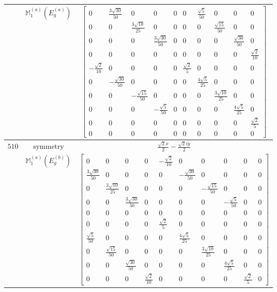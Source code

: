 \documentclass[fleqn,8pt,landscape]{jsarticle}
\begin{document}
\begin{longtable}{ccc}
$  $ & $ \mathbb{M}_{1}^{(a)}(E_{g}^{(a)}) $ & $ \begin{bmatrix} 0 & \frac{3 \sqrt{30}}{50} & 0 & 0 & 0 & 0 & \frac{\sqrt{5}}{50} & 0 & 0 & 0 \\ 0 & 0 & \frac{3 \sqrt{10}}{25} & 0 & 0 & 0 & 0 & \frac{\sqrt{15}}{50} & 0 & 0 \\ 0 & 0 & 0 & \frac{3 \sqrt{30}}{50} & 0 & 0 & 0 & 0 & \frac{\sqrt{30}}{50} & 0 \\ 0 & 0 & 0 & 0 & 0 & 0 & 0 & 0 & 0 & \frac{\sqrt{2}}{10} \\ - \frac{\sqrt{2}}{10} & 0 & 0 & 0 & 0 & \frac{\sqrt{2}}{5} & 0 & 0 & 0 & 0 \\ 0 & - \frac{\sqrt{30}}{50} & 0 & 0 & 0 & 0 & \frac{4 \sqrt{5}}{25} & 0 & 0 & 0 \\ 0 & 0 & - \frac{\sqrt{15}}{50} & 0 & 0 & 0 & 0 & \frac{3 \sqrt{10}}{25} & 0 & 0 \\ 0 & 0 & 0 & - \frac{\sqrt{5}}{50} & 0 & 0 & 0 & 0 & \frac{4 \sqrt{5}}{25} & 0 \\ 0 & 0 & 0 & 0 & 0 & 0 & 0 & 0 & 0 & \frac{\sqrt{2}}{5} \\ 0 & 0 & 0 & 0 & 0 & 0 & 0 & 0 & 0 & 0 \end{bmatrix} $ \\ \hline
$ 510 $ & $ \text{symmetry} $ & $ \frac{\sqrt{2} x}{2} - \frac{\sqrt{2} i y}{2} $ \\
$  $ & $ \mathbb{M}_{1}^{(a)}(E_{g}^{(b)}) $ & $ \begin{bmatrix} 0 & 0 & 0 & 0 & - \frac{\sqrt{2}}{10} & 0 & 0 & 0 & 0 & 0 \\ \frac{3 \sqrt{30}}{50} & 0 & 0 & 0 & 0 & - \frac{\sqrt{30}}{50} & 0 & 0 & 0 & 0 \\ 0 & \frac{3 \sqrt{10}}{25} & 0 & 0 & 0 & 0 & - \frac{\sqrt{15}}{50} & 0 & 0 & 0 \\ 0 & 0 & \frac{3 \sqrt{30}}{50} & 0 & 0 & 0 & 0 & - \frac{\sqrt{5}}{50} & 0 & 0 \\ 0 & 0 & 0 & 0 & 0 & 0 & 0 & 0 & 0 & 0 \\ 0 & 0 & 0 & 0 & \frac{\sqrt{2}}{5} & 0 & 0 & 0 & 0 & 0 \\ \frac{\sqrt{5}}{50} & 0 & 0 & 0 & 0 & \frac{4 \sqrt{5}}{25} & 0 & 0 & 0 & 0 \\ 0 & \frac{\sqrt{15}}{50} & 0 & 0 & 0 & 0 & \frac{3 \sqrt{10}}{25} & 0 & 0 & 0 \\ 0 & 0 & \frac{\sqrt{30}}{50} & 0 & 0 & 0 & 0 & \frac{4 \sqrt{5}}{25} & 0 & 0 \\ 0 & 0 & 0 & \frac{\sqrt{2}}{10} & 0 & 0 & 0 & 0 & \frac{\sqrt{2}}{5} & 0 \end{bmatrix} $ \\ \hline

\end{longtable}
\end{document}
